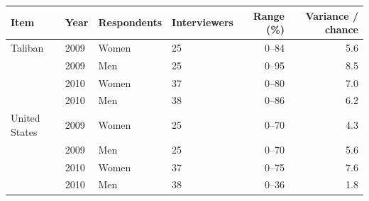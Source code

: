 \begin{tabular}{llllrr}
\toprule
Item & Year & Respondents & Interviewers & Range (\%) & Variance / chance \\
\midrule
Taliban & 2009 & Women & 25 & 0--84 & 5.6 \\
 & 2009 & Men & 25 & 0--95 & 8.5 \\
 & 2010 & Women & 37 & 0--80 & 7.0 \\
 & 2010 & Men & 38 & 0--86 & 6.2 \\
\midrule
United States & 2009 & Women & 25 & 0--70 & 4.3 \\
 & 2009 & Men & 25 & 0--70 & 5.6 \\
 & 2010 & Women & 37 & 0--75 & 7.6 \\
 & 2010 & Men & 38 & 0--36 & 1.8 \\
\bottomrule
\end{tabular}
